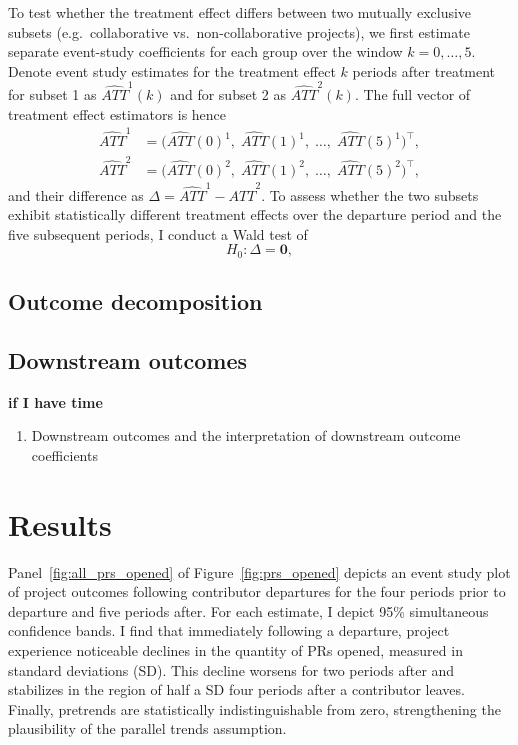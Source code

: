 \documentclass[12pt,notitlepage]{article}
\begin{document}
To test whether the treatment effect differs between two mutually exclusive subsets (e.g.\ collaborative vs.\ non-collaborative projects), we first estimate separate event-study coefficients for each group over the window \(k=0,\dots,5\). Denote event study estimates for the treatment effect $k$ periods after treatment for subset 1 as $\widehat{ATT}^1(k)$ and for subset 2 as $\widehat{ATT}^2(k)$. The full vector of treatment effect estimators is hence
\begin{align*}
\widehat{ATT}^1
&= \bigl(\widehat{ATT}(0)^1,\;\widehat{ATT}(1)^1,\;\dots,\;\widehat{ATT}(5)^1\bigr)^{\!\top},\\
\widehat{ATT}^2
&= \bigl(\widehat{ATT}(0)^2,\;\widehat{ATT}(1)^2,\;\dots,\;\widehat{ATT}(5)^2\bigr)^{\!\top},
\end{align*}
and their difference as $\Delta = \widehat{ATT}^1 - \widehat{ATT}^2$. To assess whether the two subsets exhibit statistically different treatment effects over the departure period and the five subsequent periods, I conduct a Wald test of
\[
H_0\colon \Delta = \mathbf{0},
\]
\subsection{Outcome decomposition}
\subsection{Downstream outcomes} 
\textbf{if I have time}
\begin{enumerate}
    \item Downstream outcomes and the interpretation of downstream outcome coefficients
\end{enumerate}



\section{Results} \label{sec:result}

Panel~\ref{fig:all_prs_opened} of Figure~\ref{fig:prs_opened} depicts an event study plot of project outcomes following contributor departures for the four periods prior to departure and five periods after. For each estimate, I depict 95\% simultaneous confidence bands. I find that immediately following a departure, project experience noticeable declines in the quantity of PRs opened, measured in standard deviations (SD). This decline worsens for two periods after and stabilizes in the region of half a SD four periods after a contributor leaves. Finally, pretrends are statistically indistinguishable from zero, strengthening the plausibility of the parallel trends assumption. 
\end{document}
